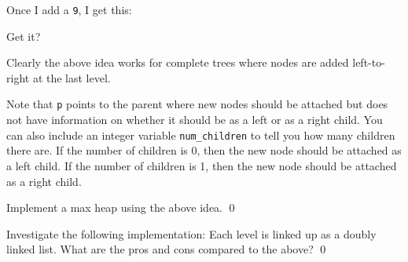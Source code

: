 Once I add a \texttt{9}, I get this:




Get it?

  
Clearly the above idea works for complete trees where
nodes are added left-to-right at the last level.

Note that \verb!p! points to the parent where new nodes should be
attached but does not have information on whether it should be
as a left or as a right child.
You can also include an integer variable \texttt{num\_children}
to tell you how many children
there are.
If the number of children is 0, then the new node should be
attached as a left child.
If the number of children is 1, then the new node should be attached
as a right child.

\begin{ex}
  Implement a max heap using the above idea.
  \qed
\end{ex}


\begin{ex}
  Investigate the following implementation:
 Each level is linked up as a doubly linked list.
 What are the pros and cons compared to the above?
 \qed
\end{ex}
